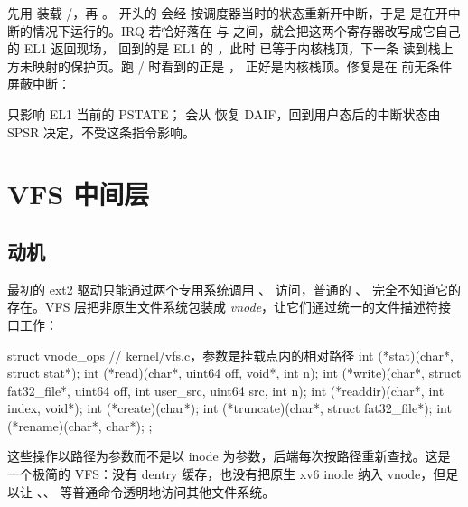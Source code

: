  先用  装载 /，再 。 开头的  会经  按调度器当时的状态重新开中断，于是  是在开中断的情况下运行的。IRQ 若恰好落在  与  之间，就会把这两个寄存器改写成它自己的 EL1 返回现场， 回到的是 EL1 的 ，此时  已等于内核栈顶，下一条  读到栈上方未映射的保护页。跑 / 时看到的正是 ， 正好是内核栈顶。修复是在  前无条件屏蔽中断：


\begin{note}
   只影响 EL1 当前的 PSTATE； 会从  恢复 DAIF，回到用户态后的中断状态由 SPSR 决定，不受这条指令影响。
\end{note}

\section{VFS 中间层}
\label{sec:vfs}

\subsection{动机}

最初的 ext2 驱动只能通过两个专用系统调用 、 访问，普通的 、 完全不知道它的存在。VFS 层把非原生文件系统包装成 \emph{vnode}，让它们通过统一的文件描述符接口工作：

\begin{ccode}
struct vnode_ops {                       // kernel/vfs.c，参数是挂载点内的相对路径
  int (*stat)(char*, struct stat*);
  int (*read)(char*, uint64 off, void*, int n);
  int (*write)(char*, struct fat32_file*, uint64 off, int user_src, uint64 src, int n);
  int (*readdir)(char*, int index, void*);
  int (*create)(char*);
  int (*truncate)(char*, struct fat32_file*);
  int (*rename)(char*, char*);
};
\end{ccode}

这些操作以路径为参数而不是以 inode 为参数，后端每次按路径重新查找。这是一个极简的 VFS：没有 dentry 缓存，也没有把原生 xv6 inode 纳入 vnode，但足以让 、、 等普通命令透明地访问其他文件系统。

